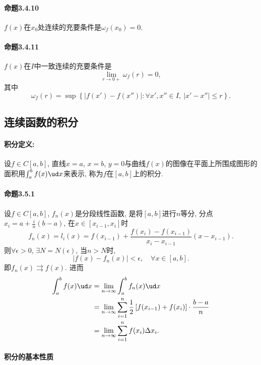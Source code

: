 \paragraph{命题3.4.10}

$f(x)$在$x_{0}$处连续的充要条件是$\omega_{f}(x_{0})=0$.

\paragraph{命题3.4.11}

$f(x)$在$I$中一致连续的充要条件是
\[
\lim_{r\to0+}\omega_{f}(r)=0,
\]
其中
\[
\omega_{f}(r)=\sup\left\{ \left|f(x')-f(x'')\right|:\forall x',x''\in I,\ \left|x'-x''\right|\le r\right\} .
\]


\subsection{连续函数的积分}

\paragraph{积分定义:}

设$f\in C[a,b]$, 直线$x=a$, $x=b$, $y=0$与曲线$f(x)$的图像在平面上所围成图形的面积用$\int_{a}^{b}f(x)\ud x$来表示,
称为$f$在$[a,b]$上的积分.

\paragraph{命题3.5.1}

设$f\in C[a,b]$, $f_{n}(x)$是分段线性函数, 是将$[a,b]$进行$n$等分, 分点$x_{i}=a+\frac{i}{n}(b-a)$,
在$x\in[x_{i-1},x_{i}]$时
\[
f_{n}(x)=l_{i}(x)=f(x_{i-1})+\frac{f(x_{i})-f(x_{i-1})}{x_{i}-x_{i-1}}(x-x_{i-1}).
\]
则$\forall\epsilon>0$, $\exists N=N(\epsilon)$, 当$n>N$时, 
\[
\left|f(x)-f_{n}(x)\right|<\epsilon,\quad\forall x\in[a,b].
\]
即$f_{n}(x)\rightrightarrows f(x)$. 进而
\begin{align*}
\int_{a}^{b}f(x)\ud x & =\lim_{n\to\infty}\int_{a}^{b}f_{n}(x)\ud x\\
 & =\lim_{n\to\infty}\sum_{i=1}^{n}\frac{1}{2}\left[f(x_{i-1})+f(x_{i})\right]\cdot\frac{b-a}{n}\\
 & =\lim_{n\to\infty}\sum_{i=1}^{n}f(x_{i})\Delta x_{i}.
\end{align*}


\paragraph{积分的基本性质}

